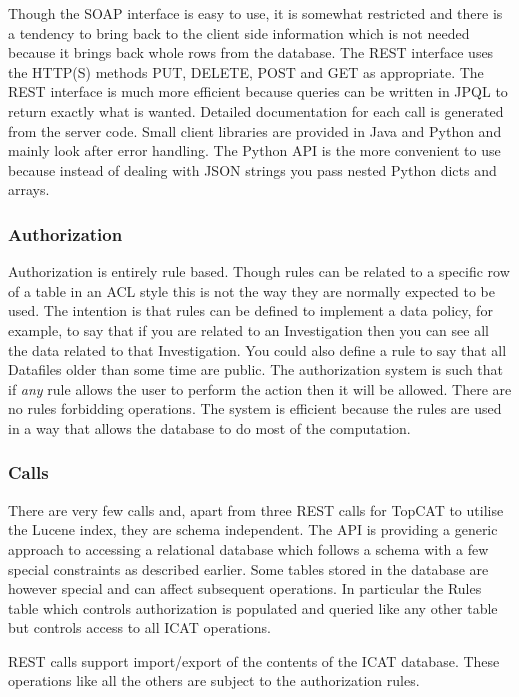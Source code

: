 \documentclass[a4paper]{jpconf}
\begin{document}
Though the SOAP interface is easy to use, it is somewhat restricted
and there is a tendency to bring back to the client side information
which is not needed because it brings back whole rows from the
database. The REST interface uses the HTTP(S) methods PUT, DELETE,
POST and GET as appropriate. The REST interface is much more efficient
because queries can be written in JPQL to return exactly what is
wanted. Detailed documentation for each call is generated from the
server code.  Small client libraries are provided in Java and Python
and mainly look after error handling.  The Python API is the more
convenient to use because instead of dealing with JSON strings you
pass nested Python dicts and arrays.

\subsubsection{Authorization}
Authorization is entirely rule based. Though rules can be related to a
specific row of a table in an ACL style this is not the way they are
normally expected to be used. The intention is that rules can be
defined to implement a data policy, for example, to say that if you
are related to an Investigation then you can see all the data related
to that Investigation. You could also define a rule to say that all
Datafiles older than some time are public. The authorization system is
such that if \emph{any} rule allows the user to perform the action
then it will be allowed. There are no rules forbidding operations. The
system is efficient because the rules are used in a way that allows
the database to do most of the computation.

\subsubsection{Calls}
There are very few calls and, apart from three REST calls for TopCAT
to utilise the Lucene index, they are schema independent. The API is
providing a generic approach to accessing a relational database which
follows a schema with a few special constraints as described
earlier. Some tables stored in the database are however special and
can affect subsequent operations. In particular the Rules table which
controls authorization is populated and queried like any other table
but controls access to all ICAT operations.

REST calls support import/export of the contents of the ICAT
database. These operations like all the others are subject to the
authorization rules.
\end{document}
